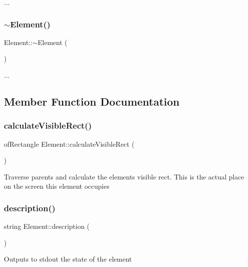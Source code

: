 ... \mbox{\label{class_element_a13d54ba9c08b6bec651402f1c2bb002c}} 
\subsubsection{\texorpdfstring{$\sim$\+Element()}{~Element()}}
{\footnotesize\ttfamily Element\+::$\sim$\+Element (\begin{DoxyParamCaption}{ }\end{DoxyParamCaption})}

... 

\subsection{Member Function Documentation}
\mbox{\label{class_element_a2dd48722ec3678bf52a9693dc0c11d13}} 
\subsubsection{\texorpdfstring{calculate\+Visible\+Rect()}{calculateVisibleRect()}}
{\footnotesize\ttfamily of\+Rectangle Element\+::calculate\+Visible\+Rect (\begin{DoxyParamCaption}{ }\end{DoxyParamCaption})}

Traverse parents and calculate the elements visible rect. This is the actual place on the screen this element occupies \mbox{\label{class_element_a8523a191a02721936d5fe6a0e77c0120}} 
\subsubsection{\texorpdfstring{description()}{description()}}
{\footnotesize\ttfamily string Element\+::description (\begin{DoxyParamCaption}{ }\end{DoxyParamCaption})}

Outputs to stdout the state of the element \mbox{\label{class_element_a37c9abed5bec87d9ce0a5e74fb872f34}} 
